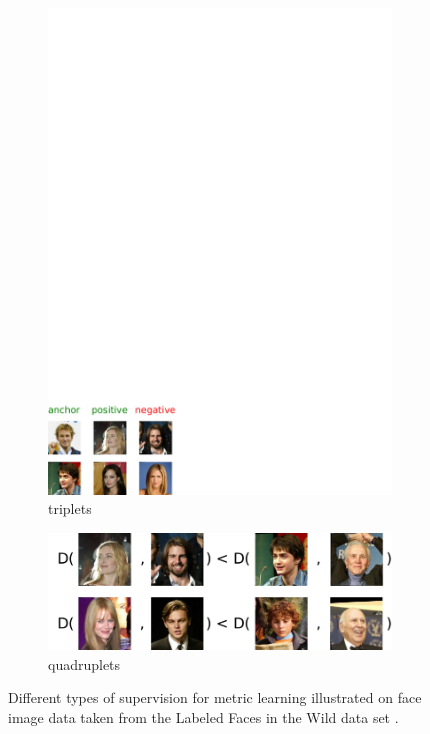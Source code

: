 \documentclass[twoside,11pt]{article}
\begin{document}
\begin{figure}[t]
\begin{subfigure}[t]{0.31\textwidth}
        \centering \includegraphics[scale=0.35]{triplets.pdf}
	\caption{triplets}\label{fig:triplets}
    \end{subfigure}
    \begin{subfigure}[t]{0.31\textwidth}
        \centering \includegraphics[scale=0.35]{quadruplets.pdf}
        \caption{quadruplets}\label{fig:quadruplets}
    \end{subfigure}
    \caption{Different types of supervision for metric learning %
    illustrated on face image data taken from the Labeled Faces in the Wild data set \citep{Huang12}.}\label{fig:flowers}
\end{figure}
\end{document}
